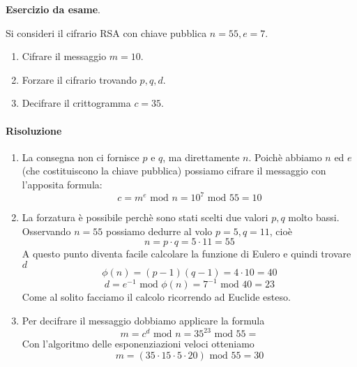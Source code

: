 \begin{framed}
	\noindent \textbf{Esercizio da esame}. 
	
	\noindent Si consideri il cifrario RSA con chiave pubblica $n = 55, e = 7$.
	\begin{enumerate}
		\item Cifrare il messaggio $m = 10$.
		\item Forzare il cifrario trovando $p, q, d$. 
		\item Decifrare il crittogramma $c = 35$.
	\end{enumerate}
	
	\paragraph{Risoluzione} 
	\begin{enumerate}
		\item La consegna non ci fornisce $p$ e $q$, ma direttamente $n$. Poichè abbiamo $n$ ed $e$ (che costituiscono la chiave pubblica) possiamo cifrare il messaggio con l'apposita formula:
		$$c=m^e \text{ mod } n ={10}^7 \text{ mod } 55=10$$
		\item La forzatura è possibile perchè sono stati scelti due valori $p,q$ molto bassi. Osservando $n=55$ possiamo dedurre al volo $p=5,q=11$, cioè
		$$n=p\cdot q = 5 \cdot 11 =55$$
		A questo punto diventa facile calcolare la funzione di Eulero e quindi trovare $d$
		$$\phi(n)=(p-1)(q-1)=4\cdot 10=40$$
		$$d=e^{-1} \text{ mod } \phi(n)=7^{-1} \text{ mod }40=23$$
		Come al solito facciamo il calcolo ricorrendo ad Euclide esteso.
		\item Per decifrare il messaggio dobbiamo applicare la formula
		$$m=c^d \text{ mod } n=35^{23} \text{ mod }55=$$
		Con l'algoritmo delle esponenziazioni veloci otteniamo
		$$m=(35 \cdot 15 \cdot 5 \cdot 20) \text{ mod }55=30$$
	\end{enumerate}
\end{framed} 


